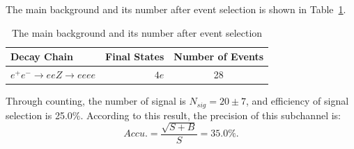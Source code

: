 \documentclass[11pt,a4paper]{cepcnote}
\begin{document}
The main background and its number after event selection is shown in Table~\ref{tab:bkgofeeevev}.
\begin{table}[H]
	\begin{center}
		\begin{tabular}{lrc}
			\hline\hline
			Decay Chain	& Final States 	&	Number of Events	\\
			\hline
			$e^+e^-\to eeZ \to eeee $ & $4e$	&	28\\
			\hline\hline
		\end{tabular}
		\caption[]{The main background and its number after event selection}
		\label{tab:bkgofeeevev}
	\end{center}
\end{table}

Through counting, the number of signal is $N_{sig} = 20\pm 7$, and efficiency of signal selection is 25.0\%. 
According to this result, the precision of this subchannel is:
\begin{equation*}
	Accu. = \frac{\sqrt{S+B}}{S} = 35.0\%. 
\end{equation*}
\end{document}
